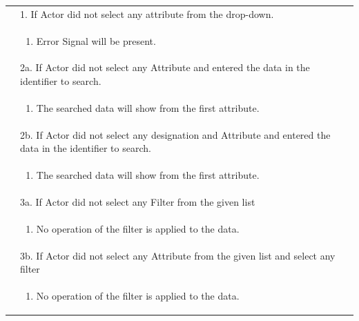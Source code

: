 \documentclass[12pt,a4paper]{article}
\begin{document}
\begin{longtable}{| p{3cm}|p{12cm}|}
& 1. If Actor did not select any attribute from the drop-down. \\
& \begin{enumerate}
		\item Error Signal will be present.
	\end{enumerate}
\\ 

& 2a. If Actor did not select any Attribute and entered the data in the identifier to search. \\
& \begin{enumerate}
		\item The searched data will show from the first attribute.
	\end{enumerate}
\\ 
& 2b. If Actor did not select any designation and  Attribute and entered the data in the identifier to search. \\
& \begin{enumerate}
		\item The searched data will show from the first attribute.
	\end{enumerate}
	\\
& 3a. If Actor did not select any Filter from the given list \\
& \begin{enumerate}
		\item No operation of the filter is applied to the data.
	\end{enumerate}
\\ 
& 3b. If Actor did not select any Attribute from the given list and select any filter  \\
& \begin{enumerate}
		\item No operation of the filter is applied to the data.
	\end{enumerate}
\\ 


\end{longtable}
\end{document}

